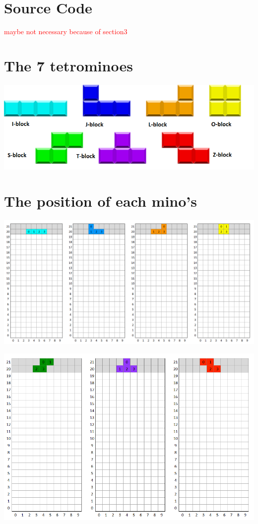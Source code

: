 \documentclass[a4paper]{article}
\begin{document}
\newpage
\appendix
\section{Source Code}
\textcolor{red}{maybe not necessary because of section3}
\section{The 7 tetrominoes}

\begin{center}
	\includegraphics[scale=0.7]{resources/img/tetrominoes}
	\label{tetrominoes}
\end{center}

\section{The position of each mino's}

\begin{center}
	\includegraphics[scale=0.7]{resources/img/minoes1}
	\label{minoes1}
\end{center}

\begin{center}
	\includegraphics[scale=0.7]{resources/img/minoes2}
	\label{minoes2}
\end{center}
\end{document}
